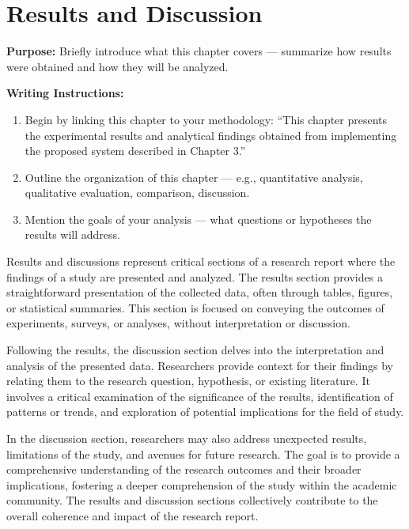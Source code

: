 \chapter{Results and Discussion}
\label{Results and Discussion}

{\color{blue}\textbf{Purpose:}
Briefly introduce what this chapter covers — summarize how results were obtained and how they will be analyzed.} \\

{\color{red}\textbf{Writing Instructions:}
\begin{enumerate}
    \item Begin by linking this chapter to your methodology:  
    ``This chapter presents the experimental results and analytical findings obtained from implementing the proposed system described in Chapter 3.''
    
    \item Outline the organization of this chapter — e.g., quantitative analysis, qualitative evaluation, comparison, discussion.
    
    \item Mention the goals of your analysis — what questions or hypotheses the results will address.
\end{enumerate}


Results and discussions represent critical sections of a research report where the findings of a study are presented and analyzed. The results section provides a straightforward presentation of the collected data, often through tables, figures, or statistical summaries. This section is focused on conveying the outcomes of experiments, surveys, or analyses, without interpretation or discussion.

Following the results, the discussion section delves into the interpretation and analysis of the presented data. Researchers provide context for their findings by relating them to the research question, hypothesis, or existing literature. It involves a critical examination of the significance of the results, identification of patterns or trends, and exploration of potential implications for the field of study.

In the discussion section, researchers may also address unexpected results, limitations of the study, and avenues for future research. The goal is to provide a comprehensive understanding of the research outcomes and their broader implications, fostering a deeper comprehension of the study within the academic community. The results and discussion sections collectively contribute to the overall coherence and impact of the research report.}

